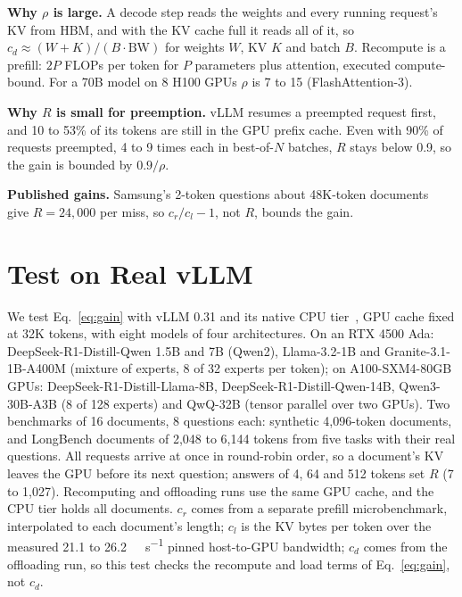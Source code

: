\documentclass[journal]{IEEEtran}
\begin{document}
\textbf{Why $\rho$ is large.} A decode step reads the weights and every running request's KV from
HBM, and with the KV cache full it reads all of it, so $c_d \approx (W + K)/(B \cdot
\mathrm{BW})$ for weights $W$, KV $K$ and batch $B$. Recompute is a prefill: $2P$ FLOPs per token for
$P$ parameters plus attention, executed compute-bound. For a 70B model on 8 H100 GPUs $\rho$ is 7 to 15 (FlashAttention-3).

\textbf{Why $R$ is small for preemption.} vLLM resumes a preempted request first, and 10 to 53\% of
its tokens are still in the GPU prefix cache. Even with 90\% of requests preempted, 4 to 9 times
each in best-of-$N$ batches, $R$ stays below 0.9, so the gain is bounded by $0.9/\rho$.

\textbf{Published gains.} Samsung's 2-token questions about 48K-token documents~\cite{samsung_cmmd}
give $R=24{,}000$ per miss, so $c_r/c_l-1$, not $R$, bounds the gain.

\section{Test on Real vLLM}
\label{sec:real}
We test Eq.~\ref{eq:gain} with vLLM 0.31 and its native CPU tier~\cite{vllmblog,vllmtiered}, GPU cache fixed
at 32K tokens, with eight models of four architectures. On an RTX 4500 Ada: DeepSeek-R1-Distill-Qwen
1.5B and 7B (Qwen2), Llama-3.2-1B and Granite-3.1-1B-A400M (mixture of experts, 8 of 32 experts per
token); on A100-SXM4-80GB GPUs: DeepSeek-R1-Distill-Llama-8B, DeepSeek-R1-Distill-Qwen-14B,
Qwen3-30B-A3B (8 of 128 experts) and QwQ-32B (tensor parallel over two GPUs). Two
benchmarks of 16 documents, 8 questions each: synthetic 4,096-token documents, and LongBench
documents of 2,048 to 6,144 tokens from five tasks with their real questions. All requests arrive at
once in round-robin order, so a document's KV leaves the GPU before its next question; answers of 4,
64 and 512 tokens set $R$ (7 to 1,027). Recomputing and offloading runs use the same GPU cache, and
the CPU tier holds all documents. $c_r$ comes from a separate
prefill microbenchmark, interpolated to each document's length; $c_l$
is the KV bytes per token over the measured 21.1 to \SI{26.2}{\giga\byte\per\second} pinned
host-to-GPU bandwidth; $c_d$ comes from the offloading run, so this test checks the recompute and load
terms of Eq.~\ref{eq:gain}, not $c_d$.
\end{document}
